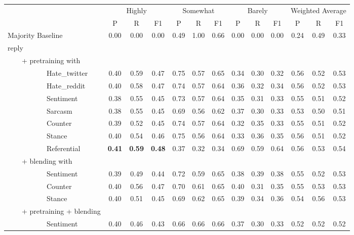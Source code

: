 \documentclass[11pt]{article}
\begin{document}
\begin{table*}
	\small
	\centering
	\setlength{\tabcolsep}{.07in}
	\begin{tabular}{l ccc ccc ccc ccc}
		\toprule
		\multicolumn{1}{c}{} & \multicolumn{3}{c}{Highly} & \multicolumn{3}{c}{Somewhat} & \multicolumn{3}{c}{Barely} & \multicolumn{3}{c}{Weighted Average} \\
		\cmidrule(lr){2-4} \cmidrule(lr){5-7} \cmidrule(lr){8-10} \cmidrule(lr){11-13} 
		& P & R & F1 & P & R & F1 & P & R & F1 & P & R & F1 \\
		\hline \addlinespace 
		Majority Baseline & 0.00 & 0.00 & 0.00 & 0.49 & 1.00 & 0.66 & 0.00 & 0.00 & 0.00 & 0.24 & 0.49 & 0.33 \\		
		reply\\
		~~~~+ pretraining with \\
		~~~~~~~~~~~Hate\_twitter & 0.40 & 0.59	& 0.47  & 0.75 & 0.57	& 0.65	& 0.34	& 0.30 & 0.32 & 0.56	& 0.52	& 0.53\\
		~~~~~~~~~~~Hate\_reddit & 0.40 & 0.58	& 0.47	& 0.74 &	0.57 &	0.64 & 0.36	& 0.32	& 0.34  &	0.56 &	0.52 &	0.53\\
		~~~~~~~~~~~Sentiment & 0.38 & 0.55	& 0.45	&	0.73 &	0.57 &	0.64 & 0.35 & 0.31 &	0.33  &	0.55 &	0.51 &	0.52\\
		~~~~~~~~~~~Sarcasm & 0.38 & 0.55 &	0.45 &	0.69 &	0.56 &	0.62 &	0.37 &	0.30 &	0.33  &	0.53 &	0.50 &	0.51\\
		~~~~~~~~~~~Counter & 0.39 & 0.52 &	0.45 &	0.74 &	0.57 &	0.64 &	0.32 &	0.35 &	0.33  & 	0.55 &	0.51 &	0.52\\
		~~~~~~~~~~~Stance & 0.40 &	0.54 &	0.46 &	0.75 &	0.56 &	0.64 &	0.33 &	0.36 &	0.35  &	0.56 &	0.51 &	0.52\\
		~~~~~~~~~~~Referential &\textbf{ 0.41 }& \textbf{0.59} & \textbf{0.48} & 0.37 & 0.32 & 0.34 & 0.69 & 0.59 & 0.64 & 0.56 & 0.53 & 0.54\\ 
		~~~~+ blending with\\
		~~~~~~~~~~~Sentiment & 0.39 & 0.49 & 0.44 &	0.72 &	0.59 &	0.65 & 0.38 &	0.39 &	0.38  &	0.55 &	0.52 &	0.53\\
		~~~~~~~~~~~Counter & 0.40  & 0.56 & 0.47 &	0.70 &	0.61 &	0.65  &	0.40 & 0.31 &	0.35 &	0.55 &	0.53 &	0.53\\
		~~~~~~~~~~~Stance & 0.40 & 0.51 & 0.45 &	0.69 &	0.62 &	0.65 &	0.39 &	0.34 &	0.36  &	0.54 &	0.56 &	0.53 \\
		~~~~+ pretraining + blending \\
		~~~~~~~~~~~Sentiment & 0.40 & 0.46 & 0.43 & 0.66 & 0.66 &	0.66 & 0.37 &	0.30 & 0.33 &	0.52 &	0.52 &	0.52\\

\end{tabular}
\end{table*}
\end{document}
